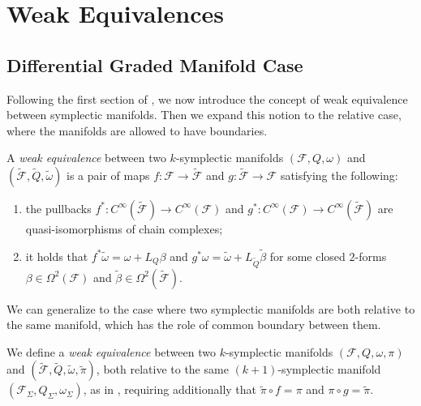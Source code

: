 \section{Weak Equivalences}
\label{sec:weak_equiv}

\subsection{Differential Graded Manifold Case}
\label{subsec:dg_mnfs_case}

Following the first section of \cite{Gluing_BV-BFV}, we now introduce the concept of weak equivalence between symplectic manifolds.
Then we expand this notion to the relative case, where the manifolds are allowed to have boundaries.

\begin{definition}
\label{def:weak_1}
    A \emph{weak equivalence} between two $k$-symplectic manifolds $(\mathcal{F}, Q, \omega)$ and $(\widetilde{\mathcal{F}}, \widetilde{Q}, \widetilde{\omega})$ is a pair of maps $f:\mathcal{F} \rightarrow \widetilde{\mathcal{F}}$ and $g:\widetilde{\mathcal{F}} \rightarrow \mathcal{F}$ satisfying the following:
    \begin{enumerate}[label = \roman*)]
        \item \label{enum:weak_a} the pullbacks $f^*:C^\infty(\widetilde{\mathcal{F}}) \rightarrow C^\infty(\mathcal{F})$ and $g^*:C^\infty(\mathcal{F}) \rightarrow C^\infty(\widetilde{\mathcal{F}})$ are quasi-isomorphisms of chain complexes;
        \item \label{enum:weak_b} it holds that $f^* \widetilde{\omega} = \omega + L_Q \beta$ and $g^* \omega = \widetilde{\omega} + L_{\widetilde{Q}} \widetilde{\beta}$ for some closed $2$-forms $\beta \in \Omega^2 (\mathcal{F})$ and $\widetilde{\beta} \in \Omega^2 (\widetilde{\mathcal{F}})$.
    \end{enumerate}
\end{definition}


We can generalize  to the case where two symplectic manifolds are both relative to the same manifold, which has the role of common boundary between them.

\begin{definition}
\label{def:weak_relative}
    We define a \emph{weak equivalence} between two $k$-symplectic manifolds $(\mathcal{F}, Q, \omega, \pi)$ and $(\widetilde{\mathcal{F}}, \widetilde{Q}, \widetilde{\omega}, \widetilde{\pi})$, both relative to the same $(k+1)$-symplectic manifold $(\mathcal{F}_\Sigma, Q_\Sigma, \omega_\Sigma)$, as in , requiring additionally that $\widetilde{\pi} \circ f = \pi$ and $\pi \circ g = \widetilde{\pi}$.
\end{definition}

